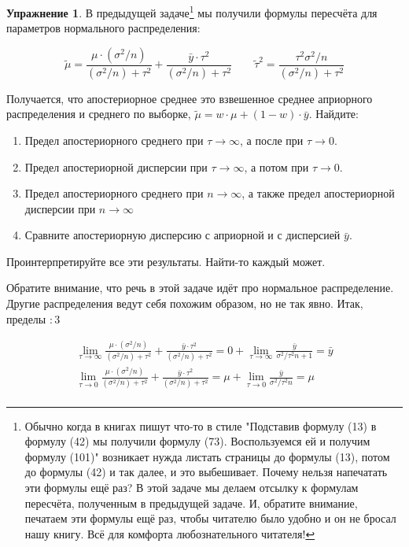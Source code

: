 \documentclass[12pt, a4paper, oneside]{extreport}
\theoremstyle{plain}              %
\theoremstyle{definition}         %
\newtheorem{problem}{\color{myblue} Упражнение}
\begin{document}
\begin{problem}\label{upr_predel}
В предыдущей задаче\footnote{Обычно когда в книгах пишут что-то в стиле "Подставив формулу (13) в формулу (42) мы получили формулу (73). Воспользуемся ей и получим формулу (101)" возникает нужда листать страницы до формулы (13), потом до формулы (42) и так далее, и это выбешивает. Почему нельзя напечатать эти формулы ещё раз? В этой задаче мы делаем отсылку к формулам пересчёта, полученным в предыдущей задаче. И, обратите внимание, печатаем эти формулы ещё раз, чтобы читателю было удобно и он не бросал нашу книгу. Всё для комфорта любознательного читателя!}  мы получили формулы пересчёта для параметров нормального распределения:

\[ \tilde \mu = \frac{\mu \cdot (\sigma^2/n)}{(\sigma^2/n) + \tau^2} + \frac{\bar y \cdot \tau^2}{(\sigma^2/n) + \tau^2}  \qquad \tilde \tau^2 = \frac{\tau^2 \sigma^2/n}{(\sigma^2/n) + \tau^2} \]

Получается, что апостериорное среднее это взвешенное среднее априорного распределения  и среднего по выборке, $\tilde \mu = w \cdot \mu + (1 - w) \cdot \bar{y}$. Найдите:

\begin{enumerate}
\item Предел апостериорного среднего при $\tau \to \infty$, а после при $\tau \to 0$. 
\item Предел апостериорной дисперсии при $\tau \to \infty$, а потом  при $\tau \to 0$.
\item Предел апостериорного среднего при $n \to \infty$, а также предел апостериорной дисперсии при $n \to \infty$
\item Сравните апостериорную дисперсию с априорной и с дисперсией $\bar y$.
\end{enumerate}

Проинтерпретируйте все эти результаты. Найти-то каждый может.

\begin{sol}
Обратите внимание, что речь в этой задаче идёт про нормальное распределение. Другие распределения ведут себя похожим образом, но не так явно. Итак, пределы $:3$

\begin{align*}
\lim_{\tau \to \infty} \frac{\mu \cdot (\sigma^2/n)}{(\sigma^2/n) + \tau^2} + \frac{\bar y \cdot \tau^2}{(\sigma^2/n) + \tau^2} = 0 + \lim_{\tau \to \infty} \frac{\bar y}{\sigma^2/\tau^2 n + 1} = \bar y \\
\lim_{\tau \to 0} \frac{\mu \cdot (\sigma^2/n)}{(\sigma^2/n) + \tau^2} + \frac{\bar y \cdot \tau^2}{(\sigma^2/n) + \tau^2} = \mu + \lim_{\tau \to 0} \frac{\bar y}{\sigma^2/\tau^2 n} = \mu  \\
\end{align*}


\end{sol}
\end{problem}
\end{document}

